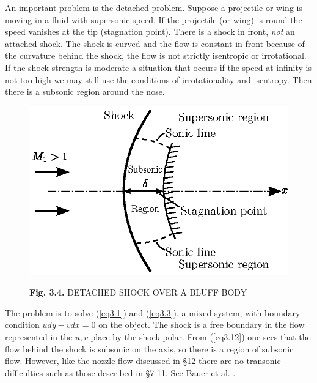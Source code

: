 An important problem is the detached problem. Suppose a projectile or wing is moving in a fluid with supersonic speed. If the projectile (or wing) is round the speed vanishes at the tip (stagnation point). There is a shock in front, {\em not} an attached shock. The shock is curved and the flow is constant in front because of the curvature behind the shock, the flow is not strictly isentropic or irrotational. If the shock strength is moderate a situation that occurs if the speed at infinity is not too high we may still use the conditions of irrotationality and isentropy. Then there is a subsonic region around the nose.
\begin{figure}[H]
\centering
\includegraphics[scale=0.8]{figures/fig3.4.eps}
\centerline{{\bf Fig. 3.4.} DETACHED SHOCK OVER A BLUFF BODY}
\end{figure}\pageoriginale

The problem is to solve (\ref{eq3.1}) and (\ref{eq3.3}), a mixed system, with boundary condition $udy - vdx = 0$ on the object. The shock is a free boundary in the flow represented in the $u,v$ place by the shock polar. From (\ref{eq3.12}) one sees that the flow behind the shock is subsonic on the axis, so there is a region of subsonic flow. However, like the nozzle flow discussed in \S 12 there are no transonic difficulties such as those described in \S 7-11. See Bauer et al. \cite{key1}.

